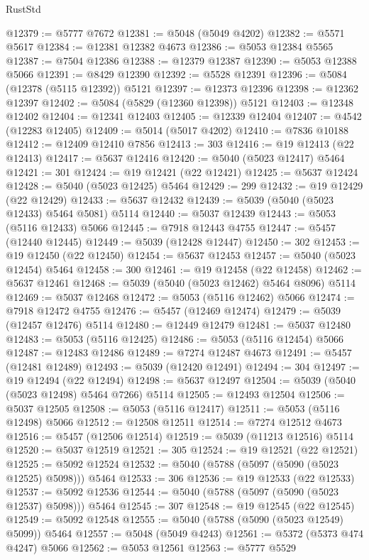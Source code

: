 \begin{lexlean}{RustStd}
\begin{coremodule}
@12379 := @5777 @7672
@12381 := @5048 (@5049 @4202)
@12382 := @5571 @5617
@12384 := @12381 @12382 @4673
@12386 := @5053 @12384 @5565
@12387 := @7504 @12386
@12388 := @12379 @12387
@12390 := @5053 @12388 @5066
@12391 := @8429 @12390
@12392 := @5528 @12391
@12396 := @5084 (@12378 (@5115 @12392)) @5121
@12397 := @12373 @12396
@12398 := @12362 @12397
@12402 := @5084 (@5829 (@12360 @12398)) @5121
@12403 := @12348 @12402
@12404 := @12341 @12403
@12405 := @12339 @12404
@12407 := @4542 (@12283 @12405)
@12409 := @5014 (@5017 @4202)
@12410 := @7836 @10188
@12412 := @12409 @12410 @7856
@12413 := 303
@12416 := @19 @12413 (@22 @12413)
@12417 := @5637 @12416
@12420 := @5040 (@5023 @12417) @5464
@12421 := 301
@12424 := @19 @12421 (@22 @12421)
@12425 := @5637 @12424
@12428 := @5040 (@5023 @12425) @5464
@12429 := 299
@12432 := @19 @12429 (@22 @12429)
@12433 := @5637 @12432
@12439 := @5039 (@5040 (@5023 @12433) @5464 @5081) @5114
@12440 := @5037 @12439
@12443 := @5053 (@5116 @12433) @5066
@12445 := @7918 @12443 @4755
@12447 := @5457 (@12440 @12445)
@12449 := @5039 (@12428 @12447)
@12450 := 302
@12453 := @19 @12450 (@22 @12450)
@12454 := @5637 @12453
@12457 := @5040 (@5023 @12454) @5464
@12458 := 300
@12461 := @19 @12458 (@22 @12458)
@12462 := @5637 @12461
@12468 := @5039 (@5040 (@5023 @12462) @5464 @8096) @5114
@12469 := @5037 @12468
@12472 := @5053 (@5116 @12462) @5066
@12474 := @7918 @12472 @4755
@12476 := @5457 (@12469 @12474)
@12479 := @5039 (@12457 @12476) @5114
@12480 := @12449 @12479
@12481 := @5037 @12480
@12483 := @5053 (@5116 @12425)
@12486 := @5053 (@5116 @12454) @5066
@12487 := @12483 @12486
@12489 := @7274 @12487 @4673
@12491 := @5457 (@12481 @12489)
@12493 := @5039 (@12420 @12491)
@12494 := 304
@12497 := @19 @12494 (@22 @12494)
@12498 := @5637 @12497
@12504 := @5039 (@5040 (@5023 @12498) @5464 @7266) @5114
@12505 := @12493 @12504
@12506 := @5037 @12505
@12508 := @5053 (@5116 @12417)
@12511 := @5053 (@5116 @12498) @5066
@12512 := @12508 @12511
@12514 := @7274 @12512 @4673
@12516 := @5457 (@12506 @12514)
@12519 := @5039 (@11213 @12516) @5114
@12520 := @5037 @12519
@12521 := 305
@12524 := @19 @12521 (@22 @12521)
@12525 := @5092 @12524
@12532 := @5040 (@5788 (@5097 (@5090 (@5023 @12525) @5098))) @5464
@12533 := 306
@12536 := @19 @12533 (@22 @12533)
@12537 := @5092 @12536
@12544 := @5040 (@5788 (@5097 (@5090 (@5023 @12537) @5098))) @5464
@12545 := 307
@12548 := @19 @12545 (@22 @12545)
@12549 := @5092 @12548
@12555 := @5040 (@5788 (@5090 (@5023 @12549) @5099)) @5464
@12557 := @5048 (@5049 @4243)
@12561 := @5372 (@5373 @474 @4247) @5066
@12562 := @5053 @12561
@12563 := @5777 @5529

\end{coremodule}
\end{lexlean}
